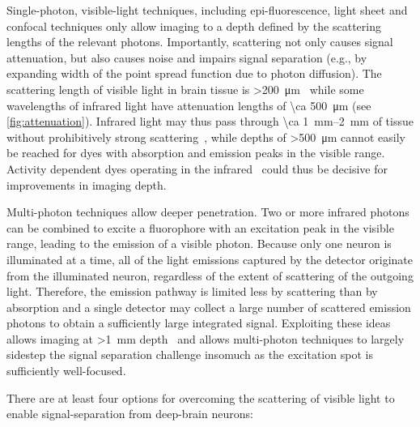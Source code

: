 Single-photon, visible-light techniques, including epi-fluorescence, light sheet and confocal techniques only allow imaging to a depth defined by the scattering lengths of the relevant photons.
Importantly, scattering not only causes signal attenuation, but also causes noise and impairs signal separation (e.g., by expanding width of the point spread function due to photon diffusion).
The scattering length of visible light in brain tissue is \SI{>200}{\micro\meter}~\cite{horton13} while some wavelengths of infrared light have attenuation lengths of \SI{\ca 500}{\micro\meter} (see \autoref{fig:attenuation}).
Infrared light may thus pass through \SIrange{\ca 1}{2}{\milli\meter} of tissue without prohibitively strong scattering~\cite{horton13,kobat09}, while depths of \SI{>500}{\micro\meter} cannot easily be reached for dyes with absorption and emission peaks in the visible range.
Activity dependent dyes operating in the infrared~\cite{filonov11,shcherbakova13} could thus be decisive for improvements in imaging depth.

Multi-photon techniques allow deeper penetration.
Two or more infrared photons can be combined to excite a fluorophore with an excitation peak in the visible range, leading to the emission of a visible photon.
Because only one neuron is illuminated at a time, all of the light emissions captured by the detector originate from the illuminated neuron, regardless of the extent of scattering of the outgoing light.
Therefore, the emission pathway is limited less by scattering than by absorption and a single detector may collect a large number of scattered emission photons to obtain a sufficiently large integrated signal.
Exploiting these ideas allows imaging at \SI{>1}{\milli\meter} depth~\cite{horton13,kobat09} and allows multi-photon techniques to largely sidestep the signal separation challenge insomuch as the excitation spot is sufficiently well-focused.

There are at least four options for overcoming the scattering of visible light to enable signal-separation from deep-brain neurons:

